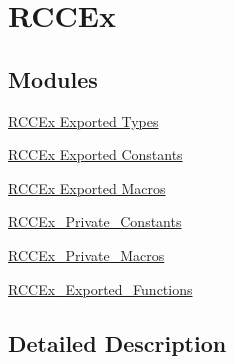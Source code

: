 \hypertarget{group___r_c_c_ex}{}\section{R\+C\+C\+Ex}
\label{group___r_c_c_ex}
\subsection*{Modules}
\begin{DoxyCompactItemize}
\item 
\hyperlink{group___r_c_c_ex___exported___types}{R\+C\+C\+Ex Exported Types}
\item 
\hyperlink{group___r_c_c_ex___exported___constants}{R\+C\+C\+Ex Exported Constants}
\item 
\hyperlink{group___r_c_c_ex___exported___macros}{R\+C\+C\+Ex Exported Macros}
\item 
\hyperlink{group___r_c_c_ex___private___constants}{R\+C\+C\+Ex\+\_\+\+Private\+\_\+\+Constants}
\item 
\hyperlink{group___r_c_c_ex___private___macros}{R\+C\+C\+Ex\+\_\+\+Private\+\_\+\+Macros}
\item 
\hyperlink{group___r_c_c_ex___exported___functions}{R\+C\+C\+Ex\+\_\+\+Exported\+\_\+\+Functions}
\end{DoxyCompactItemize}


\subsection{Detailed Description}
